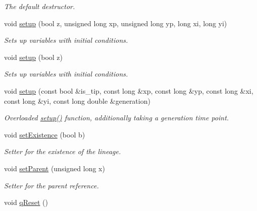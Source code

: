 \begin{DoxyCompactItemize}
\begin{DoxyCompactList}\small\item\em The default destructor. \end{DoxyCompactList}\item 
void \hyperlink{class_tree_node_aac058ef4e26cc498e54ac5d0208e96e1}{setup} (bool z, unsigned long xp, unsigned long yp, long xi, long yi)
\begin{DoxyCompactList}\small\item\em Sets up variables with initial conditions. \end{DoxyCompactList}\item 
void \hyperlink{class_tree_node_ab8300978f2020de993f8ead2e08b8377}{setup} (bool z)
\begin{DoxyCompactList}\small\item\em Sets up variables with initial conditions. \end{DoxyCompactList}\item 
void \hyperlink{class_tree_node_a5d27405bfc2cf6be90895de24b40e076}{setup} (const bool \&is\+\_\+tip, const long \&xp, const long \&yp, const long \&xi, const long \&yi, const long double \&generation)
\begin{DoxyCompactList}\small\item\em Overloaded \hyperlink{class_tree_node_aac058ef4e26cc498e54ac5d0208e96e1}{setup()} function, additionally taking a generation time point. \end{DoxyCompactList}\item 
void \hyperlink{class_tree_node_ad9f8d4d7d790cd0cd89a950cc0909519}{set\+Existence} (bool b)
\begin{DoxyCompactList}\small\item\em Setter for the existence of the lineage. \end{DoxyCompactList}\item 
void \hyperlink{class_tree_node_abd2840804b1d9b8caed25de5ae9b3ee6}{set\+Parent} (unsigned long x)
\begin{DoxyCompactList}\small\item\em Setter for the parent reference. \end{DoxyCompactList}\item 
void \hyperlink{class_tree_node_a78b82146ccdd88a405c701c1389c67e2}{q\+Reset} ()\hypertarget{class_tree_node_a78b82146ccdd88a405c701c1389c67e2}{}\label{class_tree_node_a78b82146ccdd88a405c701c1389c67e2}


\end{DoxyCompactItemize}
